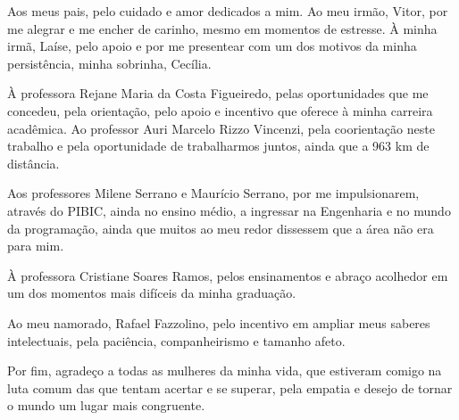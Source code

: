 \begin{agradecimentos}

Aos meus pais, pelo cuidado e amor dedicados a mim. Ao meu irmão, Vitor, por me alegrar e me encher de carinho, mesmo em momentos de estresse. À minha irmã, Laíse, pelo apoio e por me presentear com um dos motivos da minha persistência, minha sobrinha, Cecília.

À professora Rejane Maria da Costa Figueiredo, pelas oportunidades que me concedeu, pela orientação, pelo apoio e incentivo que oferece à minha carreira acadêmica. Ao professor Auri Marcelo Rizzo Vincenzi, pela coorientação neste trabalho e pela oportunidade de trabalharmos juntos, ainda que a 963 km de distância.

Aos professores Milene Serrano e Maurício Serrano, por me impulsionarem, através do PIBIC, ainda no ensino médio, a ingressar na Engenharia e no mundo da programação, ainda que muitos ao meu redor dissessem que a área não era para mim.

À professora Cristiane Soares Ramos, pelos ensinamentos e abraço acolhedor em um dos momentos mais difíceis da minha graduação. 

Ao meu namorado, Rafael Fazzolino, pelo incentivo em ampliar meus saberes intelectuais, pela paciência, companheirismo e tamanho afeto.

Por fim, agradeço a todas as mulheres da minha vida, que estiveram comigo na luta comum das que tentam acertar e se superar, pela empatia e desejo de tornar o mundo um lugar mais congruente. 

\end{agradecimentos}
